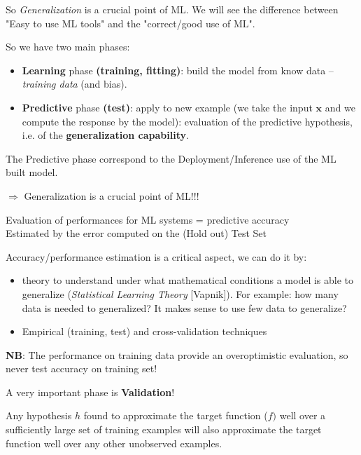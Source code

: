 \documentclass[../main.tex]{subfiles}
\begin{document}
So \textit{Generalization} is a crucial point of ML. We will see the difference between "Easy to use ML tools" and the "correct/good use of ML".

So we have two main phases:
\begin{itemize}
    \item \textbf{Learning} phase \textbf{(training, fitting)}: build the model from know data – \emph{training data} (and bias).
    \item \textbf{Predictive} phase \textbf{(test)}: apply to new example (we take the input $\textbf{x}$ and we compute the response by the model): evaluation of the predictive hypothesis, i.e. of the \textbf{generalization capability}.
\end{itemize}
The Predictive phase correspond to the Deployment/Inference use of the ML built model.

\noindent$\Rightarrow$ Generalization is a crucial point of ML!!!
\begin{center}
    Evaluation of performances for ML systems = predictive accuracy\\
    Estimated by the error computed on the (Hold out) Test Set
\end{center}

\noindent Accuracy/performance estimation is a critical aspect, we can do it by:
\begin{itemize}
    \item theory to understand under what mathematical conditions a model is able to generalize (\textit{Statistical Learning Theory} [Vapnik]). For example: how many data is needed to generalized? It makes sense to use few data to generalize?
    \item Empirical (training, test) and cross-validation techniques
\end{itemize}

\textbf{NB}: The performance on training data provide an overoptimistic evaluation, so never test accuracy on training set!

\begin{center}
A very important phase is \textbf{Validation}!   
\end{center}

\begin{definition}
Any hypothesis $h$ found to approximate the target function ($f)$ well over a sufficiently large
set of training examples will also approximate the target function well over any other unobserved examples.
\end{definition}
\end{document}
